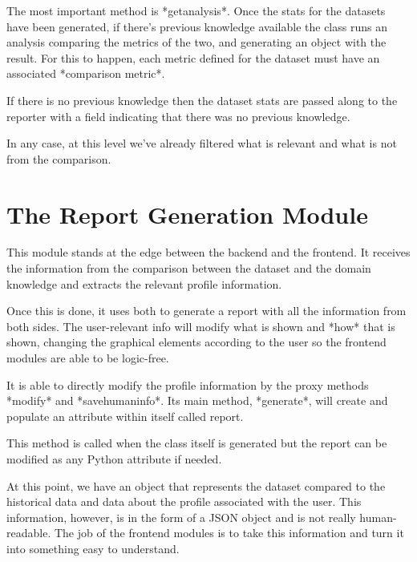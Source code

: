 The most important method is *getanalysis*. Once the stats for the datasets have been generated, if there's previous knowledge available the class runs an analysis comparing the metrics of the two, and generating an object with the result. For this to happen, each metric defined for the dataset must have an associated *comparison metric*.

If there is no previous knowledge then the dataset stats are passed along to the reporter with a field indicating that there was no previous knowledge.

In any case, at this level we've already filtered what is relevant and what is not from the comparison.

\section{The Report Generation Module}
\label{cap2:sec:reporter}
This module stands at the edge between the backend and the frontend. It receives the information from the comparison between the dataset and the domain knowledge and extracts the relevant profile information.

Once this is done, it uses both to generate a report with all the information from both sides. The user-relevant info will modify what is shown and *how* that is shown, changing the graphical elements according to the user so the frontend modules are able to be logic-free.

It is able to directly modify the profile information by the proxy methods *modify* and *savehumaninfo*. Its main method, *generate*, will create and populate an attribute within itself called report.

This method is called when the class itself is generated but the report can be modified as any Python attribute if needed.

At this point, we have an object that represents the dataset compared to the historical data and data about the profile associated with the user. This information, however, is in the form of a JSON object and is not really human-readable. The job of the frontend modules is to take this information and turn it into something easy to understand.


\section*{\NotasBibliograficas}
\TocNotasBibliograficas

